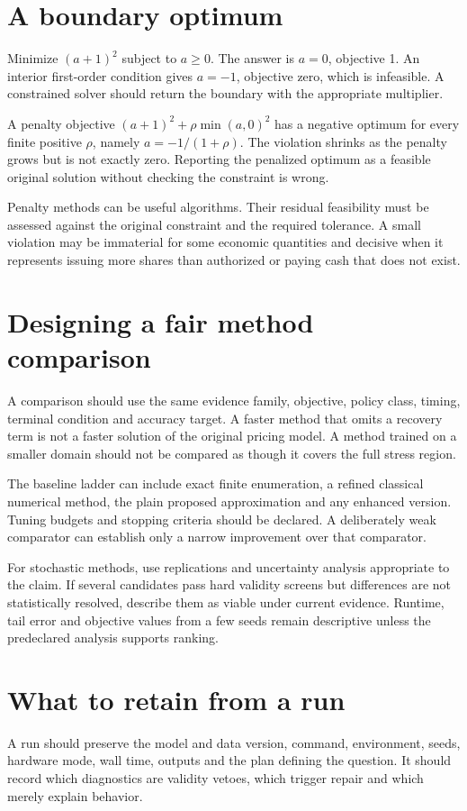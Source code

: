 \section{A boundary optimum}
Minimize $(a+1)^2$ subject to $a\geq0$. The answer is $a=0$, objective 1. An interior first-order condition gives $a=-1$, objective zero, which is infeasible. A constrained solver should return the boundary with the appropriate multiplier.

A penalty objective $(a+1)^2+\rho\min(a,0)^2$ has a negative optimum for every finite positive $\rho$, namely $a=-1/(1+\rho)$. The violation shrinks as the penalty grows but is not exactly zero. Reporting the penalized optimum as a feasible original solution without checking the constraint is wrong.

Penalty methods can be useful algorithms. Their residual feasibility must be assessed against the original constraint and the required tolerance. A small violation may be immaterial for some economic quantities and decisive when it represents issuing more shares than authorized or paying cash that does not exist.

\section{Designing a fair method comparison}
A comparison should use the same evidence family, objective, policy class, timing, terminal condition and accuracy target. A faster method that omits a recovery term is not a faster solution of the original pricing model. A method trained on a smaller domain should not be compared as though it covers the full stress region.

The baseline ladder can include exact finite enumeration, a refined classical numerical method, the plain proposed approximation and any enhanced version. Tuning budgets and stopping criteria should be declared. A deliberately weak comparator can establish only a narrow improvement over that comparator.

For stochastic methods, use replications and uncertainty analysis appropriate to the claim. If several candidates pass hard validity screens but differences are not statistically resolved, describe them as viable under current evidence. Runtime, tail error and objective values from a few seeds remain descriptive unless the predeclared analysis supports ranking.

\section{What to retain from a run}
A run should preserve the model and data version, command, environment, seeds, hardware mode, wall time, outputs and the plan defining the question. It should record which diagnostics are validity vetoes, which trigger repair and which merely explain behavior.

